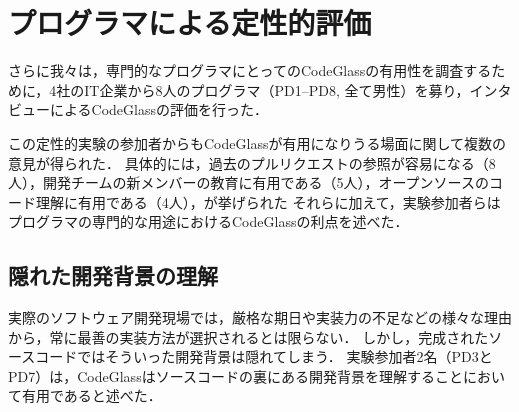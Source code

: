 \section{プログラマによる定性的評価}

さらに我々は，専門的なプログラマにとってのCodeGlassの有用性を調査するために，4社のIT企業から8人のプログラマ（PD1--PD8, 全て男性）を募り，インタビューによるCodeGlassの評価を行った．

この定性的実験の参加者からもCodeGlassが有用になりうる場面に関して複数の意見が得られた．
具体的には，過去のプルリクエストの参照が容易になる（8人），開発チームの新メンバーの教育に有用である（5人），オープンソースのコード理解に有用である（4人），が挙げられた
それらに加えて，実験参加者らはプログラマの専門的な用途におけるCodeGlassの利点を述べた．





\subsection*{隠れた開発背景の理解}

実際のソフトウェア開発現場では，厳格な期日や実装力の不足などの様々な理由から，常に最善の実装方法が選択されるとは限らない．
しかし，完成されたソースコードではそういった開発背景は隠れてしまう．
実験参加者2名（PD3とPD7）は，CodeGlassはソースコードの裏にある開発背景を理解することにおいて有用であると述べた．

